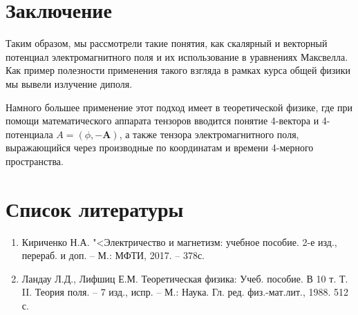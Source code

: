 \documentclass[12pt]{kiarticle}
\begin{document}

\section{Заключение}

Таким образом, мы рассмотрели такие понятия, как скалярный и векторный потенциал электромагнитного поля и их использование в уравнениях Максвелла. Как пример полезности применения такого взгляда в рамках курса общей физики мы вывели излучение диполя.

Намного большее применение этот подход имеет в теоретической физике, где при помощи математического аппарата тензоров вводится понятие 4-вектора и 4-потенциала $ A = (\phi, -\mathbf{A}) $, а также тензора электромагнитного поля, выражающийся через производные по координатам и времени 4-мерного пространства. 

\section*{Список литературы}

\begin{enumerate}
	
	\item Кириченко Н.А. "<Электричество и магнетизм: учебное пособие. 2-е изд., перераб. и доп. -- М.: МФТИ, 2017. -- 378с.
	
	\item Ландау Л.Д., Лифшиц Е.М. Теоретическая физика: Учеб. пособие. В 10 т. Т. II. Теория поля. -- 7 изд., испр. -- М.: Наука. Гл. ред. физ.-мат.лит., 1988. 512 с.
	
\end{enumerate}
\end{document}

